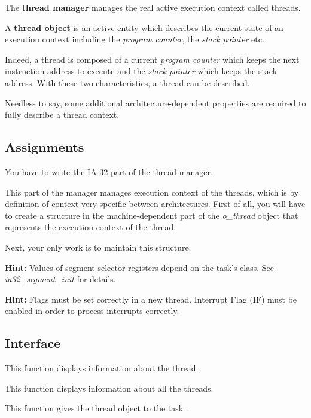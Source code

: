 The \textbf{thread manager} manages the real active execution
context called threads.

A \textbf{thread object} is an active entity which describes the
current state of an execution context including the
\textit{program counter}, the \textit{stack pointer} etc.

Indeed, a thread is composed of a current \textit{program counter}
which keeps the next instruction address to execute and the
\textit{stack pointer} which keeps the stack address. With these
two characteristics, a thread can be described.

Needless to say, some additional architecture-dependent properties
are required to fully describe a thread context.

\subsection*{Assignments}

You have to write the IA-32 part of the thread manager.

This part of the manager manages execution context of the threads,
which is by definition of context very specific between
architectures. First of all, you will have to create a structure
in the machine-dependent part of the \emph{o\_thread} object that
represents the execution context of the thread.

Next, your only work is to maintain this structure.

\textbf{Hint:} Values of segment selector registers depend on the
task's class. See \emph{ia32\_segment\_init} for details.

\textbf{Hint:} Flags must be set correctly in a new
thread. Interrupt Flag (IF) must be enabled in order to process
interrupts correctly.

\subsection*{Interface}

{
  This function displays information about the thread .
}

{
  This function displays information about all the threads.
}

{
  This function gives the thread object  to the
  task .
}

